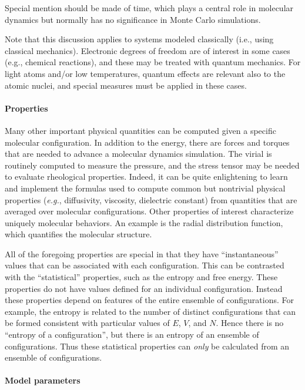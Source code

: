 \documentclass[]{article}
\let\oldparagraph\paragraph
\renewcommand{\paragraph}[1]{\oldparagraph{#1}\mbox{}}
\begin{document}
Special mention should be made of time, which plays a central role in
molecular dynamics but normally has no significance in Monte Carlo
simulations.

Note that this discussion applies to systems modeled
classically (i.e., using classical mechanics). Electronic degrees of freedom
are of interest in some cases (e.g., chemical reactions), and these may be 
treated with quantum mechanics. For light atoms and/or low temperatures, 
quantum effects are relevant also to the atomic nuclei, and special measures
must be applied in these cases.

\paragraph{Properties}\label{properties}

Many other important physical quantities can be computed given a specific
molecular configuration. In addition to the energy, there are forces and
torques that are needed to advance a molecular dynamics simulation. The
virial is routinely computed to measure the pressure, and the stress
tensor may be needed to evaluate rheological properties. Indeed, it can
be quite enlightening to learn and implement the formulas used to
compute common but nontrivial physical properties (\emph{e.g.},
diffusivity, viscosity, dielectric constant) from quantities that are
averaged over molecular configurations. Other properties of interest
characterize uniquely molecular behaviors. An example is the radial
distribution function, which quantifies the molecular structure.

All of the foregoing properties are special in that they have
``instantaneous'' values that can be associated with each configuration.
This can be contrasted with the ``statistical'' properties, such as the
entropy and free energy. These properties do not have values
defined for an individual configuration. Instead these properties depend
on features of the entire ensemble of configurations. For example, the
entropy is related to the number of distinct configurations that can be
formed consistent with particular values of $E$, $V$, and $N$. Hence there is
no ``entropy of a configuration'', but there is an entropy of an
ensemble of configurations.
Thus these statistical properties can \emph{only} be calculated from an ensemble of configurations.

\paragraph{Model parameters}\label{model-parameters}
\end{document}
